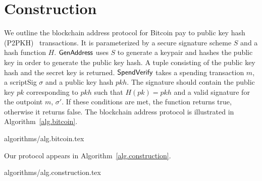 \section{Construction}\label{section:construction}

We outline the blockchain address protocol for Bitcoin pay to public key hash (P2PKH)~\cite{bitcoin-dev-guide} transactions. It is parameterized by a secure signature scheme $S$ and a hash function $H$.
$\mathsf{GenAddress}$ uses $S$ to generate a keypair and hashes the public key in order to generate the public key hash. A tuple consisting of the public key hash and the secret key is returned.
$\mathsf{SpendVerify}$ takes a spending transaction $m$, a scriptSig $\sigma$ and a public key hash $pkh$. The signature should contain the public key $pk$ corresponding to $pkh$ such that $H(pk) = pkh$ and a valid signature for the outpoint $m$, $\sigma'$. If these conditions are met, the function returns true, otherwise it returns false.
The blockchain address protocol is illustrated in Algorithm~\ref{alg.bitcoin}.

{algorithms/alg.bitcoin.tex}

Our protocol appears in Algorithm~\ref{alg.construction}.

{algorithms/alg.construction.tex}
